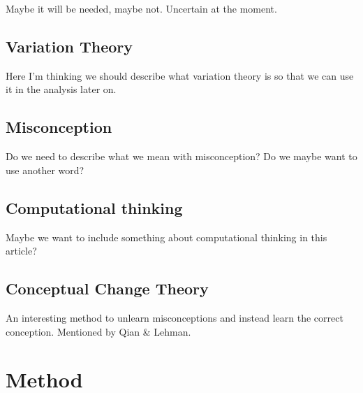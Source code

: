 \documentclass[onecolumn]{article}
\begin{document}
Maybe it will be needed, maybe not. Uncertain at the moment.

\subsection{Variation Theory}

Here I'm thinking we should describe what variation theory is so that we can use it in the analysis later on.

\subsection{Misconception}

Do we need to describe what we mean with misconception? Do we maybe want to use another word? 

\subsection{Computational thinking}

Maybe we want to include something about computational thinking in this article? 

\subsection{Conceptual Change Theory}

An interesting method to unlearn misconceptions and instead learn the correct conception. Mentioned by Qian \& Lehman. 


\section{Method}
\end{document}
